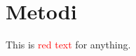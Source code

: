 \documentclass[../main.tex]{subfiles}
\begin{document}
\chapter{Metodi}
\label{chap:methods}

This is \textcolor{red}{red text} for anything.
\end{document}
